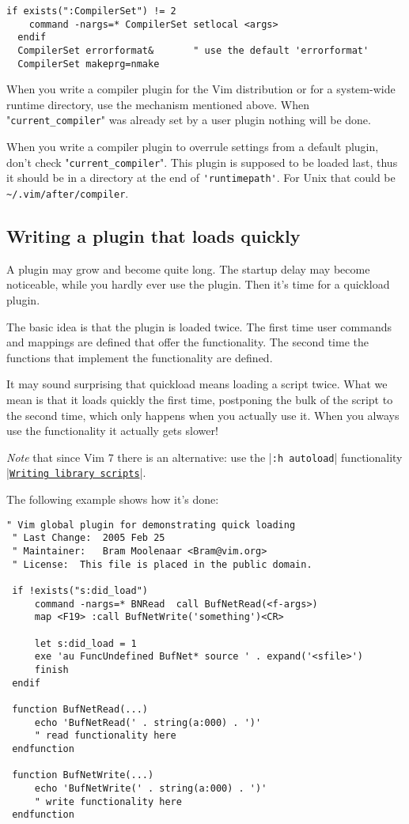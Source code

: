 \begin{Verbatim}[samepage=true]
  if exists(":CompilerSet") != 2
    command -nargs=* CompilerSet setlocal <args>
  endif
  CompilerSet errorformat&       " use the default 'errorformat'
  CompilerSet makeprg=nmake
\end{Verbatim}

When you write a compiler plugin for the Vim distribution or for a system-wide runtime directory, use the mechanism mentioned above.
When "\verb!current_compiler!" was already set by a user plugin nothing will be done.

When you write a compiler plugin to overrule settings from a default plugin, don't check "\verb!current_compiler!".
This plugin is supposed to be loaded last, thus it should be in a directory at the end of \verb!'runtimepath'!.
For Unix that could be \verb!~/.vim/after/compiler!.
\subsection{Writing a plugin that loads quickly}
\label{write-plugin-quickload}
A plugin may grow and become quite long.
The startup delay may become noticeable, while you hardly ever use the plugin.
Then it's time for a quickload plugin.

The basic idea is that the plugin is loaded twice.
The first time user commands and mappings are defined that offer the functionality.
The second time the functions that implement the functionality are defined.

It may sound surprising that quickload means loading a script twice.
What we mean is that it loads quickly the first time, postponing the bulk of the script to the second time, which only happens when you actually use it.
When you always use the functionality it actually gets slower!

\emph{Note} that since Vim 7 there is an alternative: use the |\verb!:h autoload!| functionality |\hyperref[Writing library scripts]{\texttt{Writing library scripts}}|.

The following example shows how it's done:

\begin{Verbatim}[samepage=true]
 " Vim global plugin for demonstrating quick loading
 " Last Change:  2005 Feb 25
 " Maintainer:   Bram Moolenaar <Bram@vim.org>
 " License:  This file is placed in the public domain.

 if !exists("s:did_load")
     command -nargs=* BNRead  call BufNetRead(<f-args>)
     map <F19> :call BufNetWrite('something')<CR>

     let s:did_load = 1
     exe 'au FuncUndefined BufNet* source ' . expand('<sfile>')
     finish
 endif

 function BufNetRead(...)
     echo 'BufNetRead(' . string(a:000) . ')'
     " read functionality here
 endfunction

 function BufNetWrite(...)
     echo 'BufNetWrite(' . string(a:000) . ')'
     " write functionality here
 endfunction
\end{Verbatim}

